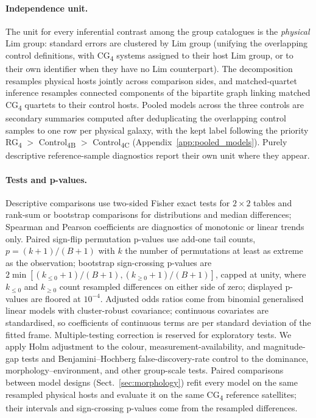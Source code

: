 \documentclass{aa}
\newcommand{\CB}{Control\textsubscript{4B}}
\newcommand{\CC}{Control\textsubscript{4C}}
\newcommand{\CG}{CG\textsubscript{4}}
\newcommand{\RG}{RG\textsubscript{4}}
\begin{document}
\begin{appendix}
\paragraph{Independence unit.} The unit for every inferential contrast among the group catalogues is the \emph{physical} Lim group: standard errors are clustered by Lim group (unifying the overlapping control definitions, with \CG{} systems assigned to their host Lim group, or to their own identifier when they have no Lim counterpart). The decomposition resamples physical hosts jointly across comparison sides, and matched-quartet inference resamples connected components of the bipartite graph linking matched \CG{} quartets to their control hosts. Pooled models across the three controls are secondary summaries computed after deduplicating the overlapping control samples to one row per physical galaxy, with the kept label following the priority \RG{} \(>\) \CB{} \(>\) \CC{} (Appendix~\ref{app:pooled_models}). Purely descriptive reference-sample diagnostics report their own unit where they appear.

\paragraph{Tests and p-values.} Descriptive comparisons use two-sided Fisher exact tests for \(2\times2\) tables and rank-sum or bootstrap comparisons for distributions and median differences; Spearman and Pearson coefficients are diagnostics of monotonic or linear trends only. Paired sign-flip permutation p-values use add-one tail counts, \(p = (k+1)/(B+1)\) with \(k\) the number of permutations at least as extreme as the observation; bootstrap sign-crossing p-values are \(2\min[(k_{\le 0}+1)/(B+1),(k_{\ge 0}+1)/(B+1)]\), capped at unity, where \(k_{\le 0}\) and \(k_{\ge 0}\) count resampled differences on either side of zero; displayed p-values are floored at \(10^{-4}\). Adjusted odds ratios come from binomial generalised linear models with cluster-robust covariance; continuous covariates are standardised, so coefficients of continuous terms are per standard deviation of the fitted frame. Multiple-testing correction is reserved for exploratory tests. We apply Holm adjustment \citep{Holm1979} to the colour, measurement-availability, and magnitude-gap tests and Benjamini--Hochberg false-discovery-rate control \citep{BenjaminiHochberg1995} to the dominance, morphology--environment, and other group-scale tests. Paired comparisons between model designs (Sect.~\ref{sec:morphology}) refit every model on the same resampled physical hosts and evaluate it on the same \CG{} reference satellites; their intervals and sign-crossing p-values come from the resampled differences.


\end{appendix}
\end{document}
